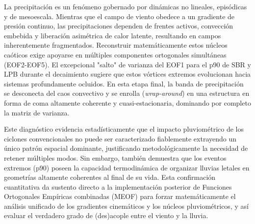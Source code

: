 La precipitación es un fenómeno gobernado por dinámicas no lineales, episódicas y de mesoescala. Mientras que el campo de viento obedece a un gradiente de presión continuo, las precipitaciones dependen de frentes activos, convección embebida y liberación asimétrica de calor latente, resultando en campos inherentemente fragmentados. Reconstruir matemáticamente estos núcleos caóticos exige apoyarse en múltiples componentes ortogonales simultáneas (EOF2-EOF5). El excepcional "salto" de varianza del EOF1 para el p90 de SBR y LPB durante el decaimiento sugiere que estos vórtices extremos evolucionan hacia sistemas profundamente ocluidos. En esta etapa final, la banda de precipitación se desconecta del caos convectivo y se enrolla (\textit{wrap-around}) en una estructura en forma de coma altamente coherente y cuasi-estacionaria, dominando por completo la matriz de varianza.

Este diagnóstico evidencia estadísticamente que el impacto pluviométrico de los ciclones convencionales no puede ser caracterizado fiablemente extrayendo un único patrón espacial dominante, justificando metodológicamente la necesidad de retener múltiples modos. Sin embargo, también demuestra que los eventos extremos (p90) poseen la capacidad termodinámica de organizar lluvias letales en geometrías altamente coherentes al final de su vida. Esta confirmación cuantitativa da sustento directo a la implementación posterior de Funciones Ortogonales Empíricas combinadas (MEOF) para forzar matemáticamente el análisis unificado de los gradientes cinemáticos y los núcleos pluviométricos, y así evaluar el verdadero grado de (des)acople entre el viento y la lluvia.
